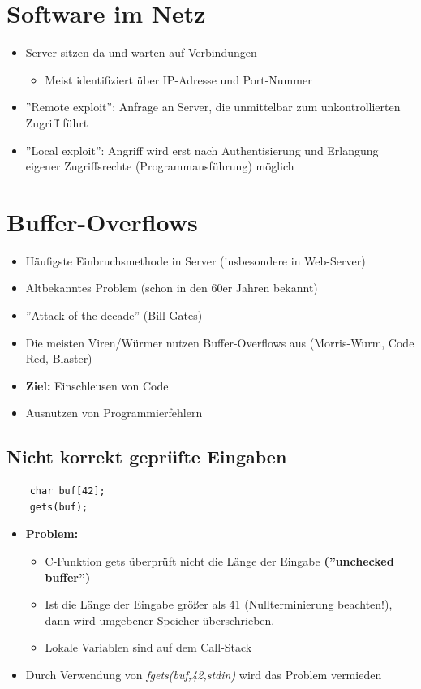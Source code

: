 \documentclass[openany]{book}
\begin{document}
\section{Software im Netz}

\begin{itemize}
    \item Server sitzen da und warten auf Verbindungen
    \begin{itemize}
        \item Meist identifiziert über IP-Adresse und Port-Nummer
    \end{itemize}
    \item ''Remote exploit'': Anfrage an Server, die unmittelbar zum unkontrollierten Zugriff führt
    \item ''Local exploit'': Angriff wird erst nach Authentisierung und Erlangung eigener Zugriffsrechte (Programmausführung) möglich
\end{itemize}

\section{Buffer-Overflows}

\begin{itemize}
    \item Häufigste Einbruchsmethode in Server (insbesondere in Web-Server)
    \item Altbekanntes Problem (schon in den 60er Jahren bekannt)
    \item ''Attack of the decade'' (Bill Gates)
    \item Die meisten Viren/Würmer nutzen Buffer-Overflows aus (Morris-Wurm, Code Red, Blaster)
    \item \textbf{Ziel:} Einschleusen von Code
    \item Ausnutzen von Programmierfehlern
\end{itemize}

\subsection{Nicht korrekt geprüfte Eingaben}

\begin{lstlisting}
    char buf[42];
    gets(buf);
\end{lstlisting}

\begin{itemize}
    \item \textbf{Problem:}
    \begin{itemize}
        \item C-Funktion gets überprüft nicht die Länge der Eingabe \textbf{(''unchecked buffer'')}
        \item Ist die Länge der Eingabe größer als 41 (Nullterminierung beachten!), dann wird umgebener Speicher überschrieben.
        \item Lokale Variablen sind auf dem Call-Stack
    \end{itemize}
    \item Durch Verwendung von \textit{fgets(buf,42,stdin)} wird das Problem vermieden
\end{itemize}
\end{document}
